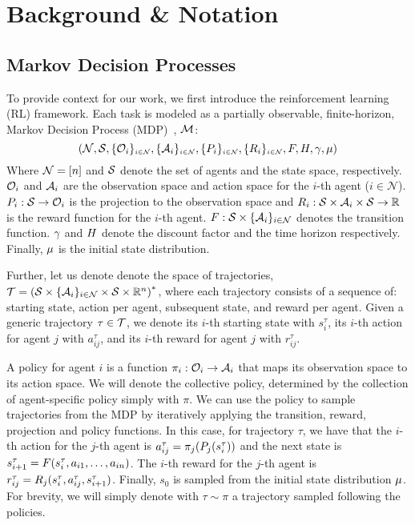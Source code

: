 \newcommand{\agents}{\mathcal{N}}


\section{Background \& Notation}\label{sect:background}

\subsection{Markov Decision Processes}
To provide context for our work, we first introduce the reinforcement learning (RL) framework. Each task is modeled as a partially observable, finite-horizon, Markov Decision Process (MDP)~\cite{Shapley53}, $\mathcal{M}$: 
$$(\agents,\states,\{\observations{i}\}_{\scriptscriptstyle i\in\agents},\{\actions{i}\}_{\scriptscriptstyle i\in\agents},\{\stateobs{i}\}_{\scriptscriptstyle i\in\agents}, \{\rewards{i}\}_{\scriptscriptstyle i\in\agents}, \transition, \horizon, \discount, \initdist)$$
Where $\agents=[\na]$ and $\mathcal{S}$ denote the set of agents and the state space, respectively. $\mathcal{O}_{i}$ and $\mathcal{A}_{i}$ are the observation space and action space for the $i$-th agent ($i\in\agents$). $P_{i}:\mathcal{S}\rightarrow\mathcal{O}_{i}$ is the projection to the observation space and $R_{i}:\mathcal{S}\times\mathcal{A}_{i}\times\mathcal{S}\rightarrow\mathbb{R}$ is the reward function for the $i$-th agent. $\transition:\states\times\{\actions{i}\}_{i\in\agents}$ denotes the transition function. $\gamma$ and $H$ denote the discount factor and the time horizon respectively. Finally, $\mu$ is the initial state distribution.

Further, let us denote denote the space of trajectories, $\trajectories = \left(\states\times\{\actions{i}\}_{i\in\agents}\times\states\times\mathbb{R}^{n}\right)^*$, where each trajectory consists of a sequence of: starting state, action per agent, subsequent state, and reward per agent. Given a generic trajectory $\tau\in\mathcal{T}$, we denote its $i$-th starting state with $s_i^\tau$, its $i$-th action for agent $j$ with $a_{ij}^\tau$, and its $i$-th reward for agent $j$ with $r_{ij}^\tau$. 

A policy for agent $i$ is a function $\pi_{i}:\mathcal{O}_{i}\rightarrow\mathcal{A}_{i}$ that maps its observation space to its action space. We will denote the collective policy, determined by the collection of agent-specific policy simply with $\pi$. We can use the policy to sample trajectories from the MDP by iteratively applying the transition, reward, projection and policy functions. In this case, for trajectory $\tau$, we have that the $i$-th action for the $j$-th agent is $a_{ij}^\tau = \pi_{j}(P_{j}(s_i^\tau))$ and the next state is $s_{i+1}^\tau = F(s_i^\tau,a_{i1},\dots,a_{in})$. The $i$-th reward for the $j$-th agent is $r_{ij}^\tau = R_{j}(s_i^\tau,a_{ij}^\tau,s_{i+1}^\tau)$. Finally, $s_0$ is sampled from the initial state distribution $\mu$. For brevity, we will simply denote with $\tau\sim\pi$ a trajectory sampled following the policies.

